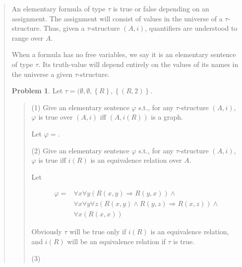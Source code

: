 \documentclass[a4paper, 12pt]{article}
\theoremstyle{definition}
\newtheorem{problem}{Problem}
\theoremstyle{definition}
\theoremstyle{definition}
\begin{document}
\begin{quote}
An elementary formula of type $\tau$ is true or false depending on 
an assignment. The assignment will consist of values in the 
universe of a $\tau$-structure. Thus, given a $\tau$-structure 
$(A, i)$, quantifiers are understood to range over $A$.

When a formula has no free variables, we say it is an elementary sentence of
type $\tau$. Its truth-value will depend entirely on the values of its names in
the universe a given $\tau$-structure.

\begin{problem}
    Let $\tau = (\emptyset, \emptyset, \left\{ R \right\} , \left\{ (R, 2) \right\} $.
\end{problem}


\small
\begin{quote}

    (1) Give an elementary sentence $\varphi$ s.t., for any $\tau$-structure $(A, i)$,
    $\varphi$ is true over $(A, i)$ iff $(A, i(R))$ is a graph.

    Let $\varphi = $.
    

    (2) Give an elementary sentence $\varphi$ s.t., for any $\tau$-structure 
    $(A, i)$, $\varphi$ is true iff $i(R)$ is an equivalence  
    relation over $A$.

    Let $ $

    \begin{align*}
        \varphi = &\forall x \forall y \left( R(x, y) \Rightarrow R(y, x)  \right) \land \\ 
        &\forall x \forall y \forall z \left( R(x, y) \land  R(y, z) \Rightarrow R(x, z) \right) \land  \\ 
        &\forall x \left( R(x, x) \right) 
    \end{align*}

    Obviously $\tau$ will be true only if $i(R)$ is an equivalence relation,
    and $i(R)$ will be an equivalence relation if $\tau$ is true.

    (3) 








\end{quote}
\normalsize











\end{quote}
\end{document}
